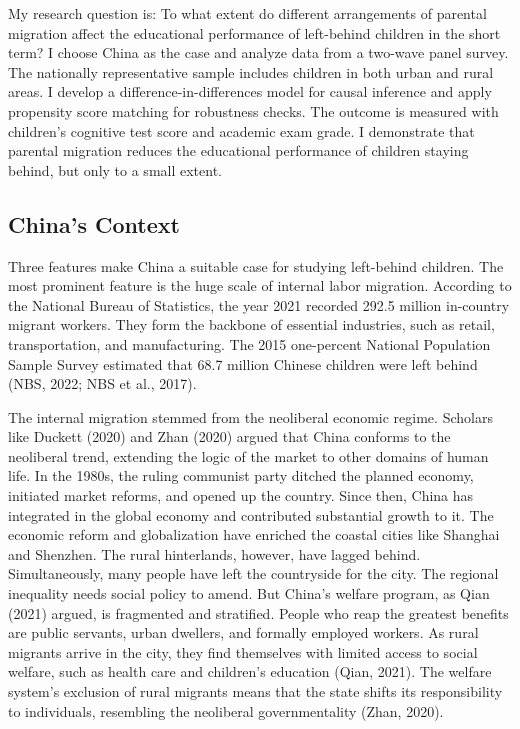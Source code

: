 \documentclass[
  man,floatsintext]{apa7}
\begin{document}
My research question is: To what extent do different arrangements of parental migration affect the educational performance of left-behind children in the short term? I choose China as the case and analyze data from a two-wave panel survey. The nationally representative sample includes children in both urban and rural areas. I develop a difference-in-differences model for causal inference and apply propensity score matching for robustness checks. The outcome is measured with children's cognitive test score and academic exam grade. I demonstrate that parental migration reduces the educational performance of children staying behind, but only to a small extent.

\hypertarget{chinas-context}{%
\subsection{China's Context}\label{chinas-context}}

Three features make China a suitable case for studying left-behind children. The most prominent feature is the huge scale of internal labor migration. According to the National Bureau of Statistics, the year 2021 recorded 292.5 million in-country migrant workers. They form the backbone of essential industries, such as retail, transportation, and manufacturing. The 2015 one-percent National Population Sample Survey estimated that 68.7 million Chinese children were left behind (NBS, 2022; NBS et al., 2017).

The internal migration stemmed from the neoliberal economic regime. Scholars like Duckett (2020) and Zhan (2020) argued that China conforms to the neoliberal trend, extending the logic of the market to other domains of human life. In the 1980s, the ruling communist party ditched the planned economy, initiated market reforms, and opened up the country. Since then, China has integrated in the global economy and contributed substantial growth to it. The economic reform and globalization have enriched the coastal cities like Shanghai and Shenzhen. The rural hinterlands, however, have lagged behind. Simultaneously, many people have left the countryside for the city. The regional inequality needs social policy to amend. But China's welfare program, as Qian (2021) argued, is fragmented and stratified. People who reap the greatest benefits are public servants, urban dwellers, and formally employed workers. As rural migrants arrive in the city, they find themselves with limited access to social welfare, such as health care and children's education (Qian, 2021). The welfare system's exclusion of rural migrants means that the state shifts its responsibility to individuals, resembling the neoliberal governmentality (Zhan, 2020).
\end{document}
